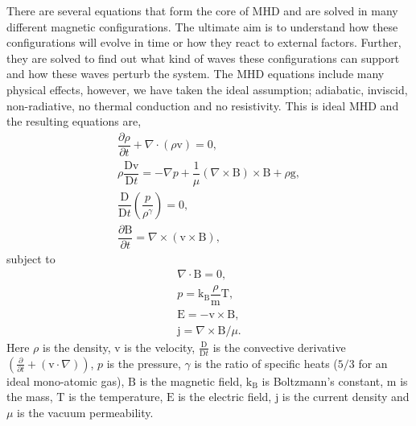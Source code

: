     There are several equations that form the core of MHD and are solved in many different magnetic configurations. 
    The ultimate aim is to understand how these configurations will evolve in time or how they react to external factors.
    Further, they are solved to find out what kind of waves these configurations can support and how these waves perturb the system. 
    The MHD equations include many physical effects, however, we have taken the ideal assumption; adiabatic, inviscid, non-radiative, no thermal conduction and no resistivity.
    This is ideal MHD and the resulting equations are,
    \begin{align}                                                         
        \dfrac{\partial \rho }{\partial t} + \nabla \cdot (\rho \boldsymbol{\mathrm{v}}) =       
        0,\tag{Mass Conservation}\\                                  
        \rho \dfrac{\mathrm{D}\boldsymbol{\mathrm{v}}}{\mathrm{D}t} =
        -\nabla p + \dfrac{1}{\mu}(\nabla \times \boldsymbol{\mathrm{B}}) \times \boldsymbol{\mathrm{B}} + \rho \boldsymbol{\mathrm{g}},\tag{Equation of Motion}\\
        \dfrac{\mathrm{D}}{\mathrm{D}t} \left(\dfrac{p}{\rho^\gamma} \right)  = 0,\tag{Energy Equation}\\       
        \dfrac{\partial \boldsymbol{\mathrm{B}}}{\partial t} = \nabla \times (\boldsymbol{\mathrm{v}} \times \boldsymbol{\mathrm{B}}),\tag{Induction Equation}               
    \end{align}
    subject to
    \begin{align}
        \nabla \cdot \boldsymbol{\mathrm{B}} = 0,\tag{Solenoid Equation}\\
        p = \mathrm{k_B} \dfrac{\rho}{\mathrm{m}} \mathrm{T},\tag{Ideal Gas Law}\\  
        \boldsymbol{\mathrm{E}} = - \boldsymbol{\mathrm{v}} \times \boldsymbol{\mathrm{B}},\tag{Ohm's Law}\\
        \boldsymbol{\mathrm{j}} = \nabla \times \boldsymbol{\mathrm{B}}/ \mu.\tag{Electric Current}                          
    \end{align}
    Here $\rho$ is the density, $\boldsymbol{\mathrm{v}}$ is the velocity, $\frac{\mathrm{D}}{\mathrm{D}t}$ is the convective derivative $\left(\frac{\partial}{\partial t} + (\boldsymbol{\mathrm{v}}\cdot\nabla)\right)$, $p$ is the pressure, $\gamma$ is the ratio of specific heats ($5/3$ for an ideal mono-atomic gas), $\boldsymbol{\mathrm{B}}$ is the magnetic field, $\mathrm{k_B}$ is Boltzmann's constant, $\mathrm{m}$ is the mass, $\mathrm{T}$ is the temperature, $\boldsymbol{\mathrm{E}}$ is the electric field, $\boldsymbol{\mathrm{j}}$ is the current density and $\mu$ is the vacuum permeability. 

